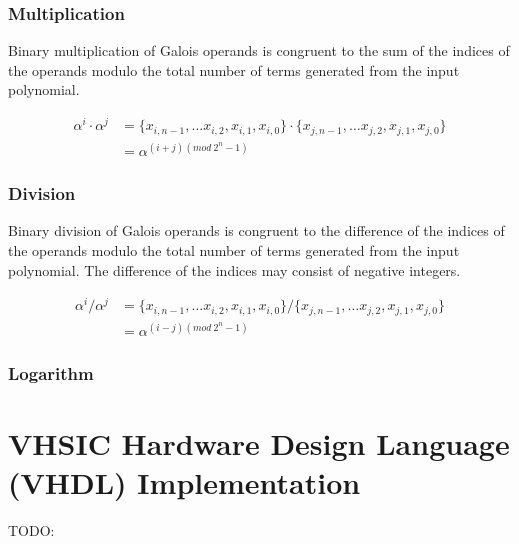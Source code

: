 \documentclass[paper=usletter, fontsize=12pt]{article}
\begin{document}
            \subsubsection{Multiplication}
            Binary multiplication of Galois operands is congruent to the sum of the indices of the operands modulo the total number of terms generated from the input polynomial.

                \begin{equation*}
                    \begin{split}
                        \alpha^{i} \cdot \alpha^{j} & = \{x_{i, n-1},\ldots x_{i, 2},x_{i, 1},x_{i, 0}\} \cdot \{x_{j, n-1}, \ldots x_{j, 2}, x_{j, 1}, x_{j, 0}\} \\
                        & = \alpha^{(i + j) (mod \ 2^{n}-1)}
                    \end{split}
                \end{equation*}

            \subsubsection{Division}
            Binary division of Galois operands is congruent to the difference of the indices of the operands modulo the total number of terms generated from the input polynomial. The difference of the indices may consist of negative integers.

                \begin{equation*}
                    \begin{split}
                        \alpha^{i} / \alpha^{j} & = \{x_{i, n-1},\ldots x_{i, 2},x_{i, 1},x_{i, 0}\} / \{x_{j, n-1}, \ldots x_{j, 2}, x_{j, 1}, x_{j, 0}\} \\
                        & = \alpha^{(i - j) (mod \ 2^{n}-1)}
                    \end{split}
                \end{equation*}

            \subsubsection{Logarithm}

            \newpage

    \section{VHSIC Hardware Design Language (VHDL) Implementation}
    TODO:
\end{document}
